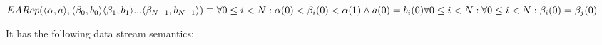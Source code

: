 $
EARep(\langle \alpha, a \rangle, \langle \beta_0, b_0 \rangle \langle \beta_1, b_1 \rangle... \langle \beta_{N-1}, b_{N-1} \rangle) \equiv \\
\forall 0 \leq i < N : \alpha(0) < \beta_i(0) < \alpha(1) \land a(0) = b_i(0) \\
\forall 0 \leq i < N : \forall 0 \leq i < N : \beta_i(0) = \beta_j(0)
$

It has the following data stream semantics:\\
